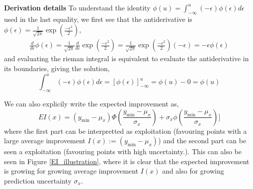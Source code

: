 \begin{note}
    \textbf{Derivation details}
    To understand the identity $\phi(u) = \int_{-\infty}^u
    (-\epsilon)  \phi(\epsilon) d\epsilon$ used in the last equality, we first see that the antiderivative
is $\phi(\epsilon) = \frac{1}{\sqrt{2\pi}} \exp\left(\frac{-\epsilon^2}{2}\right)$,
\begin{align*}
    \frac{d}{d \epsilon} \phi(\epsilon) =  \frac{1}{\sqrt{2\pi}}\frac{d}{d \epsilon}  \exp\left(\frac{-\epsilon^2}{2}\right) 
    =  \frac{1}{\sqrt{2\pi}}\exp\left(\frac{-\epsilon^2}{2}\right)(-\epsilon)
    = -\epsilon \phi(\epsilon)
\end{align*}
and evaluating the rieman integral is equivalent to evaluate the antiderivative in its boundaries, giving the 
solution, 
$$\int_{-\infty}^u
(-\epsilon)  \phi(\epsilon) d\epsilon = \left[\phi(\epsilon)\right]_{-\infty}^u = \phi(u)-0 = \phi(u)$$ 
\end{note}

We can also explicily write the expected improvement as, 
$$EI(x) = (y_{\min}-\mu_x)\Phi\left(\frac{y_{\min}-\mu_x}{\sigma_x}\right)+ \sigma_x
\phi\left(\frac{y_{\min}-\mu_x}{\sigma_x}\right)]$$ where the first part can be interpretted as
exploitation (favouring points with a large average improvement $I(x) := (y_{\min}-\mu_x)$) and the second
part can be seen a exploitation (favouring points with high uncertainty.). This can also be seen
in Figure \eqref{EI_illustration}, where it is clear that the expected improvement is growing for
growing average improvement $I(x)$ and also for growing prediction uncertainty $\sigma_x$.




